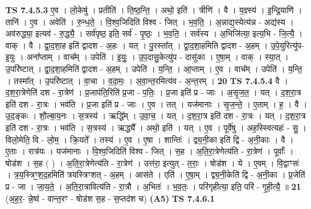 \documentclass[17pt]{extarticle}
\begin{document}
                  \newline
                                \textbf{ TS 7.4.5.3} \newline
                  ए॒व । लो॒केषु॑ । प्रतीति॑ । ति॒ष्ठ॒न्ति॒ । अथो॒ इति॑ । त्रीणि॑ । वै । य॒ज्ञ्स्य॑ । इ॒न्द्रि॒याणि॑ । तानि॑ । ए॒व । अवेति॑ । रु॒न्ध॒ते॒ । वि॒श्व॒जिदिति॑ विश्व - जित् । भ॒व॒ति॒ । अ॒न्नाद्य॒स्येत्य॑न्न - अद्य॑स्य । अव॑रुद्ध्या॒ इत्यव॑ - रु॒द्ध्यै॒ । सर्व॑पृष्ठ॒ इति॒ सर्व॑ - पृ॒ष्ठः॒ । भ॒व॒ति॒ । सर्व॑स्य । अ॒भिजि॑त्या॒ इत्य॒भि - जि॒त्यै॒ । वाक् । वै । द्वा॒द॒शा॒ह इति॑ द्वादश - अ॒हः । यत् । पु॒रस्ता᳚त् । द्वा॒द॒शा॒हमिति द्वादश - अ॒हम् । उ॒पे॒युरित्यु॑प-इ॒युः । अना᳚प्ताम् । वाच᳚म् । उपेति॑ । इ॒युः॒ । उ॒प॒दासु॒केत्यु॑प - दासु॑का । ए॒षा॒म् । वाक् । स्या॒त् । उ॒परि॑ष्टात् । द्वा॒द॒शा॒हमिति॑ द्वादश - अ॒हम् । उपेति॑ । य॒न्ति॒ । आ॒प्ताम् । ए॒व । वाच᳚म् । उपेति॑ । य॒न्ति॒ । तस्मा᳚त् । उ॒परि॑ष्टात् । वा॒चा । व॒दा॒मः॒ । अ॒वा॒न्त॒रमित्य॑व - अ॒न्त॒रम् । \textbf{  20} \newline
                  \newline
                                \textbf{ TS 7.4.5.4} \newline
                  वै । द॒श॒रा॒त्रेणेति॑ दश - रा॒त्रेण॑ । प्र॒जाप॑ति॒रिति॑ प्र॒जा - प॒तिः॒ । प्र॒जा इति॑ प्र - जाः । अ॒सृ॒ज॒त॒ । यत् । द॒श॒रा॒त्र इति॑ दश - रा॒त्रः । भव॑ति । प्र॒जा इति॑ प्र - जाः । ए॒व । तत् । यज॑मानाः । सृ॒ज॒न्ते॒ । ए॒ताम् । ह॒ । वै । उ॒द॒ङ्कः । शौ॒ल्बा॒य॒नः । स॒त्रस्य॑ । ऋद्धि᳚म् । उ॒वा॒च॒ । यत् । द॒श॒रा॒त्र इति॑ दश - रा॒त्रः । यत् । द॒श॒रा॒त्र इति॑ दश - रा॒त्रः । भव॑ति । स॒त्रस्य॑ । ऋद्ध्यै᳚ । अथो॒ इति॑ । यत् । ए॒व । पूर्वे॑षु । अह॒स्स्वित्यहः॑ - सु॒ । विलो॒मेति॒ वि - लो॒म॒ । क्रि॒यते᳚ । तस्य॑ । ए॒व । ए॒षा । शान्तिः॑ । द्व्य॒नी॒का इति॑ द्वि - अ॒नी॒काः । वै । ए॒ताः । रात्र॑यः । यज॑मानाः । वि॒श्व॒जिदिति॑ विश्व - जित् । स॒ह । अ॒ति॒रा॒त्रेणेत्य॑ति - रा॒त्रेण॑ । पूर्वाः᳚ । षोड॑श । स॒ह ( ) । अ॒ति॒रा॒त्रेणेत्य॑ति - रा॒त्रेण॑ । उत्त॑रा॒ इत्युत् - त॒राः॒ । षोड॑श । ये । ए॒वम् । वि॒द्वाꣳसः॑ । त्र॒य॒स्त्रिꣳ॒॒श॒द॒हमिति॑ त्रयस्त्रिꣳशत् - अ॒हम् । आस॑ते । एति॑ । ए॒षा॒म् । द्व्य॒नी॒केति॑ द्वि - अ॒नी॒का । प्र॒जेति॑ प्र - जा । जा॒य॒ते॒ । अ॒ति॒रा॒त्रावित्य॑ति - रा॒त्रौ । अ॒भितः॑ । भ॒व॒तः॒ । परि॑गृहीत्या॒ इति॒ परि॑ - गृ॒ही॒त्यै॒ ॥ \textbf{  21} \newline
                  \newline
                      (अ॒ह॒र॒- न्ने॒ष्व॑ - वान्त॒रꣳ - षोड॑श स॒ह - स॒प्तद॑श च)  \textbf{(A5)} \newline \newline
                                \textbf{ TS 7.4.6.1} \newline
\end{document}
